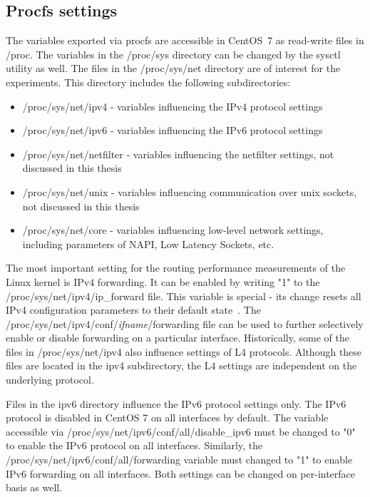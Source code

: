 
\subsection{Procfs settings}\label{subsec:analysis-settings-procfs}
The variables exported via procfs are accessible in CentOS~7 as read-write files in /proc.
The variables in the /proc/sys directory can be changed by the sysctl utility as well.
The files in the /proc/sys/net directory are of interest for the experiments.
This directory includes the following subdirectories:
\begin{itemize}
\item /proc/sys/net/ipv4 - variables influencing the IPv4 protocol settings
\item /proc/sys/net/ipv6 - variables influencing the IPv6 protocol settings
\item /proc/sys/net/netfilter - variables influencing the netfilter settings, not discussed in this thesis
\item /proc/sys/net/unix - variables influencing communication over unix sockets, not discussed in this thesis
\item /proc/sys/net/core - variables influencing low-level network settings, including parameters of NAPI, Low Latency Sockets, etc.
\end{itemize}

The most important setting for the routing performance measurements of the Linux kernel is IPv4 forwarding.
It can be enabled by writing "1" to the /proc/sys/net/ipv4/ip\_forward file.
This variable is special - its change resets all IPv4 configuration parameters to their default state~\cite{kernel-doc-ip-sysctl}.
The /proc/sys/net/ipv4/conf/{\it{ifname}}/forwarding file can be used
to further selectively enable or disable forwarding on a particular interface.
Historically, some of the files in /proc/sys/net/ipv4 also influence settings of L4 protocols.
Although these files are located in the ipv4 subdirectory, the L4 settings are independent on the underlying protocol.

Files in the ipv6 directory influence the IPv6 protocol settings only.
The IPv6 protocol is disabled in CentOS 7 on all interfaces by default.
The variable accessible via /proc/sys/net/ipv6/conf/all/disable\_ipv6 must be changed to "0" to
enable the IPv6 protocol on all interfaces.
Similarly, the /proc/sys/net/ipv6/conf/all/forwarding variable must changed to "1" to enable IPv6 forwarding on all interfaces.
Both settings can be changed on per-interface basis as well.

